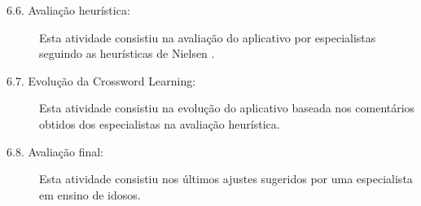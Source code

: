\begin{description}
\begin{description}
    \item[6.6. Avaliação heurística:] 
    Esta atividade consistiu na avaliação do aplicativo por especialistas seguindo as heurísticas de Nielsen \citep{nielsen2005ten}.
    
    \item[6.7. Evolução da Crossword Learning:] 
    Esta atividade consistiu na evolução do aplicativo baseada nos comentários obtidos dos especialistas na avaliação heurística.
    
     \item[6.8. Avaliação final:] 
    Esta atividade consistiu nos últimos ajustes sugeridos por uma especialista em ensino de idosos.
\end{description}

\end{description}